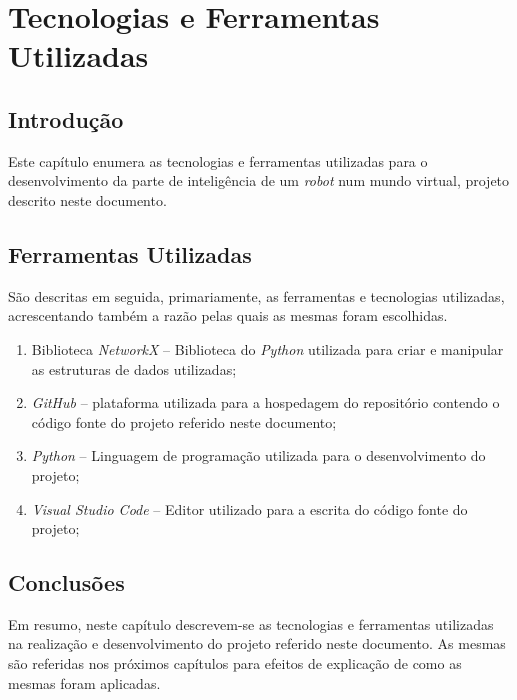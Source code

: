 \chapter{Tecnologias e Ferramentas Utilizadas}
\label{chap:tecno-ferra}

\section{Introdução}
\label{chap2:sec:intro}
Este capítulo enumera as tecnologias e ferramentas utilizadas para o desenvolvimento da parte de inteligência de um \emph{robot} num mundo virtual, projeto descrito neste documento.

\section{Ferramentas Utilizadas}
São descritas em seguida, primariamente, as ferramentas e tecnologias utilizadas, acrescentando também a razão pelas quais as mesmas foram escolhidas.
\label{chap2:sec:ferr}
\begin{enumerate}
    \item Biblioteca \emph{NetworkX} \cite{NetworkX} -- Biblioteca do \emph{Python} \cite{Python} utilizada para criar e manipular as estruturas de dados utilizadas;
    \item \emph{GitHub} \cite{GitHub}-- plataforma utilizada para a hospedagem do repositório contendo o código fonte do projeto referido neste documento;
    \item \emph{Python} \cite{Python}-- Linguagem de programação utilizada para o desenvolvimento do projeto;
    \item \emph{Visual Studio Code} \cite{Code} -- Editor utilizado para a escrita do código fonte do projeto;
\end{enumerate}

\section{Conclusões}
\label{chap2:sec:concs}
Em resumo, neste capítulo descrevem-se as tecnologias e ferramentas utilizadas na realização e desenvolvimento do projeto referido neste documento. As mesmas são referidas nos próximos capítulos para efeitos de explicação de como as mesmas foram aplicadas.